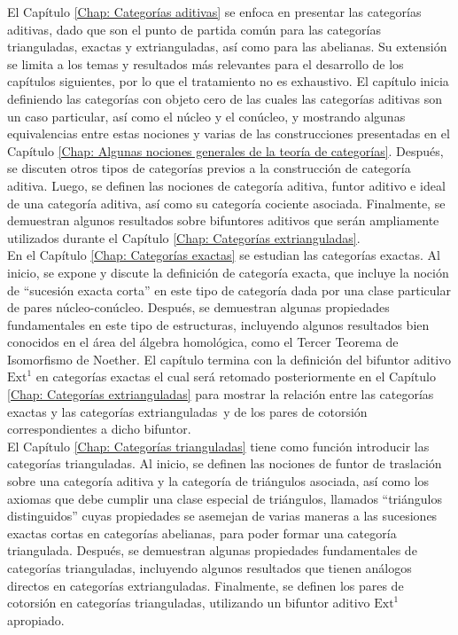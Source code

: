 \documentclass[tesis]{subfiles}
\begin{document}
El Capítulo \ref{Chap: Categorías aditivas} se enfoca en presentar las categorías aditivas, dado que son el punto de partida común para las categorías trianguladas, exactas y extrianguladas, así como para las abelianas. Su extensión se limita a los temas y resultados más relevantes para el desarrollo de los capítulos siguientes, por lo que el tratamiento no es exhaustivo. El capítulo inicia definiendo las categorías con objeto cero \textemdash de las cuales las categorías aditivas son un caso particular\textemdash, así como el núcleo y el conúcleo, y mostrando algunas equivalencias entre estas nociones y varias de las construcciones presentadas en el Capítulo \ref{Chap: Algunas nociones generales de la teoría de categorías}. Después, se discuten otros tipos de categorías previos a la construcción de categoría aditiva. Luego, se definen las nociones de categoría aditiva, funtor aditivo e ideal de una categoría aditiva, así como su categoría cociente asociada. Finalmente, se demuestran algunos resultados sobre bifuntores aditivos que serán ampliamente utilizados durante el Capítulo \ref{Chap: Categorías extrianguladas}. \\

En el Capítulo \ref{Chap: Categorías exactas} se estudian las categorías exactas. Al inicio, se expone y discute la definición de categoría exacta, que incluye la noción de ``sucesión exacta corta'' en este tipo de categoría dada por una clase particular de pares núcleo-conúcleo. Después, se demuestran algunas propiedades fundamentales en este tipo de estructuras, incluyendo algunos resultados bien conocidos en el área del álgebra homológica, como el Tercer Teorema de Isomorfismo de Noether. El capítulo termina con la definición del bifuntor aditivo $\text{Ext}^1$ en categorías exactas \textemdash el cual será retomado posteriormente en el Capítulo \ref{Chap: Categorías extrianguladas} para mostrar la relación entre las categorías exactas y las categorías extrianguladas\textemdash \ y de los pares de cotorsión correspondientes a dicho bifuntor. \\

El Capítulo \ref{Chap: Categorías trianguladas} tiene como función introducir las categorías trianguladas. Al inicio, se definen las nociones de funtor de traslación sobre una categoría aditiva y la categoría de triángulos asociada, así como los axiomas que debe cumplir una clase especial de triángulos, llamados ``triángulos distinguidos'' \textemdash cuyas propiedades se asemejan de varias maneras a las sucesiones exactas cortas en categorías abelianas\textemdash, para poder formar una categoría triangulada. Después, se demuestran algunas propiedades fundamentales de categorías trianguladas, incluyendo algunos resultados que tienen análogos directos en categorías extrianguladas. Finalmente, se definen los pares de cotorsión en categorías trianguladas, utilizando un bifuntor aditivo $\text{Ext}^1$ apropiado. \\
\end{document}
